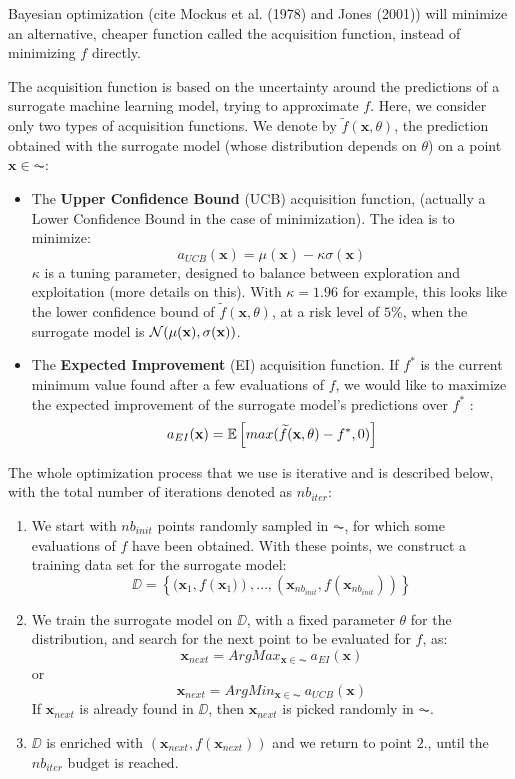\medskip

Bayesian optimization (cite Mockus et al. (1978) and Jones (2001)) will minimize an alternative, cheaper function called the acquisition function, instead of minimizing $f$ directly. 

\medskip

The acquisition function is based on the uncertainty around the predictions of a surrogate machine learning model, trying to approximate $f$. Here, we consider only two types of acquisition functions. We denote by $\widetilde{f}(\textbf{x}, \theta)$, the prediction obtained with the surrogate model (whose distribution depends on $\theta$) on a point $\textbf{x} \in \AC$: 

\begin{itemize}
\item The \textbf{Upper Confidence Bound} (UCB) acquisition function, (actually a Lower Confidence Bound in the case of minimization). The idea is to minimize: 
$$
a_{UCB}(\textbf{x}) = \mu(\textbf{x}) - \kappa \sigma(\textbf{x})
$$
$\kappa$ is a tuning parameter, designed to balance between exploration and exploitation (more details on this). With $\kappa = 1.96$ for example, this looks like the lower confidence bound of $\widetilde{f}(\textbf{x}, \theta)$, at a risk level of $5$\%, when the surrogate model is $\mathcal{N}(\mu(\textbf{x}), \sigma(\textbf{x}))$. 

\medskip

\item The \textbf{Expected Improvement} (EI) acquisition function. If $f^*$ is the current minimum value found after a few evaluations of $f$, we would like to maximize the expected improvement of the surrogate model's predictions over $f^*$ :  
$$
a_{EI}(\textbf{x}) = \mathbb{E} \left[ max(\widetilde{f}(\textbf{x}, \theta) - f^*, 0)\right]
$$
\end{itemize}

\medskip 

The whole optimization process that we use is iterative and is described below, with the total number of iterations denoted as $nb_{iter}$: 

\begin{enumerate}
\item We start with $nb_{init}$ points randomly sampled in $\AC$, for which some evaluations of $f$ have been obtained. With these points, we construct a training data set for the surrogate model:
$$
\DD = \left \lbrace (\textbf{x}_1, f\left(\textbf{x}_1)\right), \ldots,  (\textbf{x}_{nb_{init}}, f(\textbf{x}_{nb_{init}}))\right \rbrace
$$
\item We train the surrogate model on $\DD$, with a fixed parameter $\theta$ for the distribution, and search for the next point to be evaluated for $f$, as: 
$$
\textbf{x}_{next} = ArgMax_{\textbf{x} \in \AC} \: a_{EI}(\textbf{x})
$$ or 
$$
\textbf{x}_{next} = ArgMin_{\textbf{x} \in \AC} \: a_{UCB}(\textbf{x})
$$
If $\textbf{x}_{next}$ is already found in $\DD$, then $\textbf{x}_{next}$ is picked randomly in $\AC$.
\item $\DD$ is enriched with $(\textbf{x}_{next}, f(\textbf{x}_{next}))$ and we return to point $2.$, until the $nb_{iter}$ budget is reached.
\end{enumerate}

